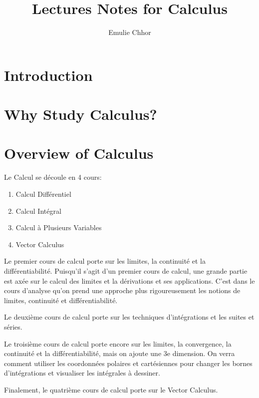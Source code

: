 \documentclass{article}
\begin{document}
\title{Lectures Notes for Calculus}
\author{Emulie Chhor}
\maketitle

\section*{Introduction}

\section{Why Study Calculus?}

\section{Overview of Calculus}

Le Calcul se découle en 4 cours:

    \begin{enumerate}
	\item Calcul Différentiel
	\item Calcul Intégral
	\item Calcul à Plusieurs Variables
	\item Vector Calculus
    \end{enumerate}

Le premier cours de calcul porte sur les limites, la continuité et la
différentiabilité. Puisqu'il s'agit d'un premier cours de calcul, une grande
partie est axée sur le calcul des limites et la dérivations et ses applications.
C'est dans le cours d'analyse qu'on prend une approche plus rigoureusement les
notions de limites, continuité et différentiabilité.

Le deuxième cours de calcul porte sur les techniques d'intégrations et les suites
et séries.

Le troisième cours de calcul porte encore sur les limites, la convergence,
la continuité et la différentiabilité, mais on ajoute une 3e dimension. On verra
comment utiliser les coordonnées polaires et cartésiennes pour changer les bornes
d'intégrations et visualiser les intégrales à dessiner.

Finalement, le quatrième cours de calcul porte sur le Vector Calculus.

\pagebreak

\newtheorem{definition}{Definition}[subsection]
\newtheorem{theorem}{Theorem}[subsection]
\newtheorem{corollary}{Corollary}[subsection]
\newtheorem{lemma}[theorem]{Lemma}
\newtheorem{proposition}{Proposition}[section]
\newtheorem{axiom}{Axiome}
\newtheorem{property}{Propriété}[subsection]
\newtheorem*{remark}{Remarque}
\newtheorem*{problem}{Problème}
\newtheorem*{intuition}{Intuition}
\end{document}
